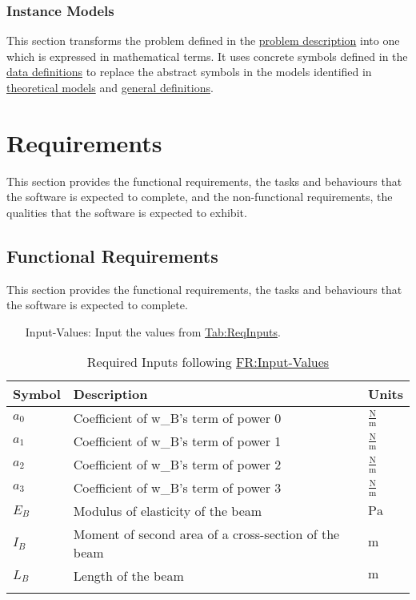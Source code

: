 \documentclass[12pt]{article}
\begin{document}
\subsubsection{Instance Models}
\label{Sec:IMs}
This section transforms the problem defined in the \hyperref[Sec:ProbDesc]{problem description} into one which is expressed in mathematical terms. It uses concrete symbols defined in the \hyperref[Sec:DDs]{data definitions} to replace the abstract symbols in the models identified in \hyperref[Sec:TMs]{theoretical models} and \hyperref[Sec:GDs]{general definitions}.

\section{Requirements}
\label{Sec:Requirements}
This section provides the functional requirements, the tasks and behaviours that the software is expected to complete, and the non-functional requirements, the qualities that the software is expected to exhibit.

\subsection{Functional Requirements}
\label{Sec:FRs}
This section provides the functional requirements, the tasks and behaviours that the software is expected to complete.

\begin{itemize}
\item[Input-Values:\phantomsection\label{inputValues}]{Input the values from \hyperref[Table:ReqInputs]{Tab:ReqInputs}.}
\end{itemize}
\begin{longtabu}{l X[l] l}
\toprule
\textbf{Symbol} & \textbf{Description} & \textbf{Units}
\\
\midrule
\endhead
${a_{\text{0}}}$ & Coefficient of w\_B's term of power 0 & $\frac{\text{N}}{\text{m}}$
\\
${a_{\text{1}}}$ & Coefficient of w\_B's term of power 1 & $\frac{\text{N}}{\text{m}}$
\\
${a_{\text{2}}}$ & Coefficient of w\_B's term of power 2 & $\frac{\text{N}}{\text{m}}$
\\
${a_{\text{3}}}$ & Coefficient of w\_B's term of power 3 & $\frac{\text{N}}{\text{m}}$
\\
${E_{B}}$ & Modulus of elasticity of the beam & ${\text{Pa}}$
\\
${I_{B}}$ & Moment of second area of a cross-section of the beam & ${\text{m}}$
\\
${L_{B}}$ & Length of the beam & ${\text{m}}$
\\
\bottomrule
\caption{Required Inputs following \hyperref[inputValues]{FR:Input-Values}}
\label{Table:ReqInputs}
\end{longtabu}
\end{document}
